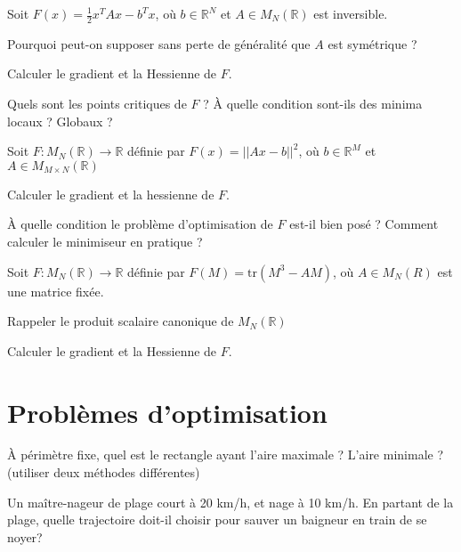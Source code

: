 \documentclass[12pt,a4paper,fleqn]{report}
\newcommand{\R}{\mathbb R}
\begin{document}
\begin{exercice}
  Soit $F(x) = \frac 1 2 x^{T} A x - b^{T} x$, où $b \in \R^{N}$ et $A
  \in M_{N}(\R)$ est inversible.
  \begin{questions}
  \item Pourquoi peut-on supposer sans perte de généralité que $A$ est
    symétrique ?
  \item Calculer le gradient et la Hessienne de $F$.
  \item Quels sont les points critiques de $F$ ? À quelle condition
    sont-ils des minima locaux ? Globaux ?
  \end{questions}
\end{exercice}

\begin{exercice}
  Soit $F : M_{N}(\R) \to \R$ définie par $F(x) = ||{A x - b}||^{2}$, où
  $b \in \R^{M}$ et $A \in M_{M \times N}(\R)$
  \begin{questions}
  \item Calculer le gradient et la hessienne de $F$.
  \item À quelle condition le problème d'optimisation de $F$ est-il
    bien posé ? Comment calculer le minimiseur en pratique ?
  \end{questions}
\end{exercice}

\begin{exercice}
  Soit $F : M_{N}(\R) \to \R$ définie par $F(M) = \text{tr}(M^{3} - A
  M)$, où $A \in M_{N}(R)$ est une matrice fixée.
  \begin{questions}
  \item Rappeler le produit scalaire canonique de $M_{N}(\R)$
  \item Calculer le gradient et la Hessienne de $F$.
  \end{questions}
\end{exercice}

\section{Problèmes d'optimisation}

\begin{exercice}
  À périmètre fixe, quel est le rectangle ayant l'aire maximale ?
  L'aire minimale ? (utiliser deux méthodes différentes)
\end{exercice}

\begin{exercice}
  Un maître-nageur de plage court à 20 km/h, et nage à 10 km/h. En
  partant de la plage, quelle trajectoire doit-il choisir pour sauver
  un baigneur en train de se noyer?
\end{exercice}
\end{document}
